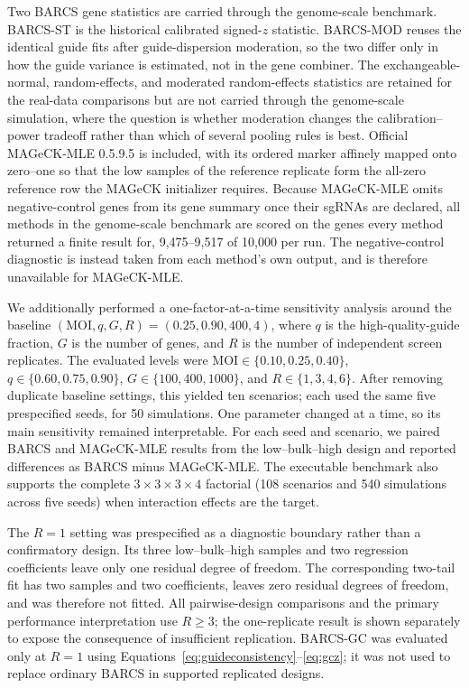 Two BARCS gene statistics are carried through the genome-scale benchmark.
BARCS-ST is the historical calibrated signed-$z$ statistic.  BARCS-MOD reuses
the identical guide fits after guide-dispersion moderation, so the two differ
only in how the guide variance is estimated, not in the gene combiner.  The
exchangeable-normal, random-effects, and moderated random-effects statistics
are retained for the real-data comparisons but are not carried through the
genome-scale simulation, where the question is whether moderation changes the
calibration--power tradeoff rather than which of several pooling rules is
best.  Official MAGeCK-MLE 0.5.9.5 is included, with its ordered marker
affinely mapped onto zero--one so that the low samples of the reference
replicate form the all-zero reference row the MAGeCK initializer requires.
Because MAGeCK-MLE omits negative-control genes from its gene summary once
their sgRNAs are declared, all methods in the genome-scale benchmark are
scored on the genes every method returned a finite result for, 9,475--9,517
of 10,000 per run.  The negative-control diagnostic is instead taken from
each method's own output, and is therefore unavailable for MAGeCK-MLE.

We additionally performed a one-factor-at-a-time sensitivity analysis around
the baseline $(\mathrm{MOI},q,G,R)=(0.25,0.90,400,4)$, where $q$ is the
high-quality-guide fraction, $G$ is the number of genes, and $R$ is the number
of independent screen replicates.  The evaluated levels were
$\mathrm{MOI}\in\{0.10,0.25,0.40\}$,
$q\in\{0.60,0.75,0.90\}$, $G\in\{100,400,1000\}$, and
$R\in\{1,3,4,6\}$.  After removing duplicate baseline settings, this yielded
ten scenarios; each used the same five prespecified seeds, for 50 simulations.
One parameter changed at a time, so its main sensitivity remained
interpretable.  For each seed and scenario, we paired BARCS and MAGeCK-MLE
results from the low--bulk--high design and reported differences as BARCS
minus MAGeCK-MLE.  The executable benchmark also supports the complete
$3\times3\times3\times4$ factorial (108 scenarios and 540 simulations across
five seeds) when interaction effects are the target.

The $R=1$ setting was prespecified as a diagnostic boundary rather than a
confirmatory design.  Its three low--bulk--high samples and two regression
coefficients leave only one residual degree of freedom.  The corresponding
two-tail fit has two samples and two coefficients, leaves zero residual
degrees of freedom, and was therefore not fitted.  All
pairwise-design comparisons and the primary performance interpretation use
$R\geq3$; the one-replicate result is shown separately to expose the
consequence of insufficient replication.  BARCS-GC was evaluated only at
$R=1$ using Equations~\eqref{eq:guideconsistency}--\eqref{eq:gcz}; it was not
used to replace ordinary BARCS in supported replicated designs.

